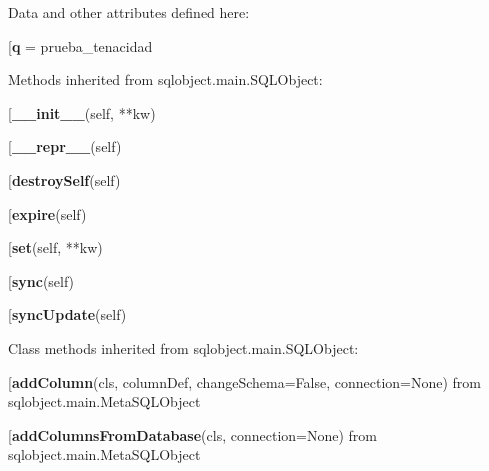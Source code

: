 Data and other attributes defined here:\\
\begin{description}\item[{\bf q} = prueba\_tenacidad\end{description}


Methods inherited from sqlobject.main.SQLObject:\\
\begin{description}\item[{\bf \_\_init\_\_}(self, **kw)\end{description}

\begin{description}\item[{\bf \_\_repr\_\_}(self)\end{description}

\begin{description}\item[{\bf destroySelf}(self)\end{description}

\begin{description}\item[{\bf expire}(self)\end{description}

\begin{description}\item[{\bf set}(self, **kw)\end{description}

\begin{description}\item[{\bf sync}(self)\end{description}

\begin{description}\item[{\bf syncUpdate}(self)\end{description}


Class methods inherited from sqlobject.main.SQLObject:\\
\begin{description}\item[{\bf addColumn}(cls, columnDef, changeSchema=False, connection=None) from sqlobject.main.MetaSQLObject\end{description}

\begin{description}\item[{\bf addColumnsFromDatabase}(cls, connection=None) from sqlobject.main.MetaSQLObject\end{description}

